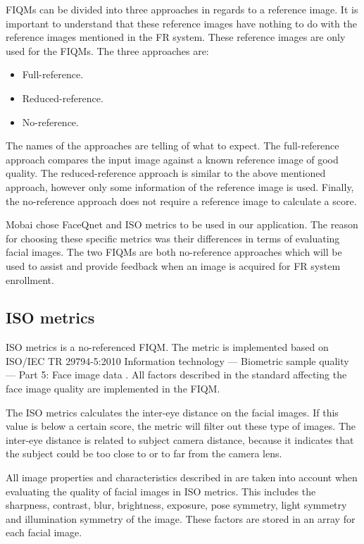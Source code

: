 FIQMs can be divided into three approaches in regards to a reference image. It is important to understand that these reference images have nothing to do with the reference images mentioned in the FR system. These reference images are only used for the FIQMs. The three approaches are: 
%
\begin{itemize}
    \item Full-reference.
    \item Reduced-reference.
    \item No-reference. 
\end{itemize}
%
The names of the approaches are telling of what to expect. The full-reference approach compares the input image against a known reference image of good quality. The reduced-reference approach is similar to the above mentioned approach, however only some information of the reference image is used. Finally, the no-reference approach does not require a reference image to calculate a score. 

Mobai chose FaceQnet and ISO metrics to be used in our application. The reason for choosing these specific metrics was their differences in terms of evaluating facial images. The two FIQMs are both no-reference approaches which will be used to assist and provide feedback when an image is acquired for FR system enrollment. 


\subsection{ISO metrics}
ISO metrics is a no-referenced FIQM. The metric is implemented based on ISO/IEC TR 29794-5:2010 Information technology — Biometric sample quality — Part 5: Face image data \cite{ISO50912}. All factors described in the standard affecting the face image quality are implemented in the FIQM. 

The ISO metrics calculates the inter-eye distance on the facial images. If this value is below a certain score, the metric will filter out these type of images. The inter-eye distance is related to subject camera distance, because it indicates that the subject could be too close to or to far from the camera lens. 

All image properties and characteristics described in \cite{ISO50912} are taken into account when evaluating the quality of facial images in ISO metrics. This includes the sharpness, contrast, blur, brightness, exposure, pose symmetry, light symmetry and illumination symmetry of the image. These factors are stored in an array for each facial image. 

